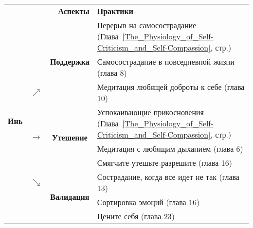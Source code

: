 \begin{table}[!h]
	\begin{center}
		\setlength{\extrarowheight}{1mm}
		\begin{tabular}{ccc||l}
			\multicolumn{3}{r||}{{\large\textbf{Аспекты}}} &{\large\textbf{Практики}}\\
			\cline{3-4}
			\multirow{9}{*}{{\huge\textbf{Инь}}} &  & \multirow{3}{*}{\textbf{Поддержка}} & Перерыв на самосострадание (Глава~\ref{The_Physiology_of_Self-Criticism_and_Self-Compassion}, стр.\:\pageref{IP:Self-Compassion_Break})\\ 
			&  &  & Самосострадание в повседневной жизни (глава 8)\\ 
			& $\nearrow$ &  & Медитация любящей доброты к себе (глава 10)\\ \cline{3-4}
			& \multirow{3}{*}{\textbf{$\rightarrow$}} & \multirow{3}{*}{\textbf{Утешение}} & Успокаивающие прикосновения (Глава~\ref{The_Physiology_of_Self-Criticism_and_Self-Compassion}, стр.\:\pageref{IP:Soothing_Touch})\\
			&   &   & Медитация с любящим дыханием (глава 6)\\
			&   &   & Смягчите-утешьте-разрешите (глава 16)\\ \cline{3-4}
			& $\searrow$ & \multirow{3}{*}{\textbf{Валидация}} & Сострадание, когда все идет не так (глава 13)\\
			&   &   & Сортировка эмоций (глава 16)\\
			&   &   & Цените себя (глава 23)\\ \cline{3-4}
		\end{tabular}
	\end{center}
\end{table} 
